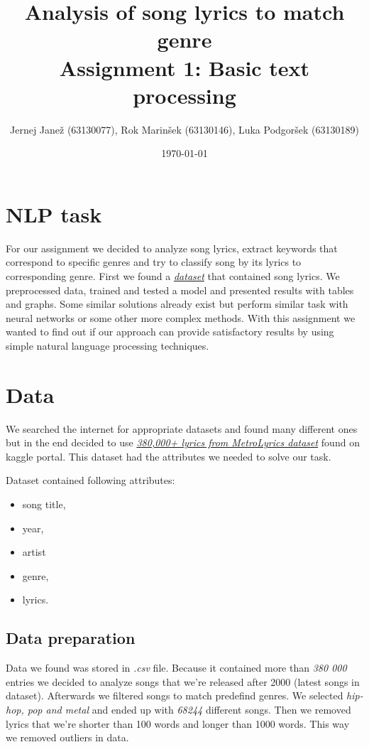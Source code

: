 \documentclass[a4paper,11pt]{article}
\title{%
Analysis of song lyrics to match genre \\
\large Assignment 1: Basic text processing}
\author{Jernej Janež (63130077), Rok Marinšek (63130146), Luka Podgoršek (63130189)}
\date{\today}
\begin{document}
\maketitle

\section{NLP task}
For our assignment we decided to analyze song lyrics, extract keywords that correspond to specific genres and try to classify song by its lyrics to corresponding genre. First we found a \href{https://www.kaggle.com/gyani95/380000-lyrics-from-metrolyrics}{\textit{dataset}} that contained song lyrics. We preprocessed data, trained and tested a model and presented results with tables and graphs. Some similar solutions already exist but perform similar task with neural networks or some other more complex methods. With this assignment we wanted to find out if our approach can provide satisfactory results by using simple natural language processing techniques.

\section{Data}
We searched the internet for appropriate datasets and found many different ones but in the end decided to use \href{https://www.kaggle.com/gyani95/380000-lyrics-from-metrolyrics}{\textit{380,000+ lyrics from MetroLyrics dataset}} found on kaggle portal. This dataset had the attributes we needed to solve our task.

\noindent Dataset contained following attributes:
\begin{itemize}
\item song title,
\item year,
\item artist
\item genre,
\item lyrics.
\end{itemize}

\subsection{Data preparation}
Data we found was stored in \textit{.csv} file. Because it contained more than \textit{380 000} entries we decided to analyze songs that we're released after 2000 (latest songs in dataset). Afterwards we filtered songs to match predefind genres. We selected \textit{hip-hop, pop  and metal} and ended up with \textit{68244} different songs. Then we removed lyrics that we're shorter than 100 words and longer than 1000 words. This way we removed outliers in data.
\end{document}
